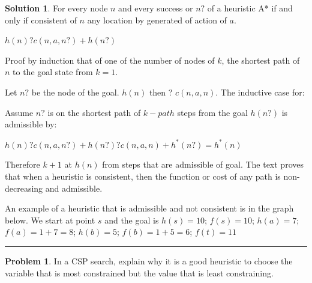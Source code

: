 \documentclass{article}
\theoremstyle{definition}
\newtheorem{problem}{Problem}
\def\fline{\rule{0.75\linewidth}{0.5pt}}
\newcommand{\finishline}{\begin{center}\fline\end{center}}
\newtheorem*{solution*}{Solution}
\newenvironment{solution}{\begin{solution*}}{{\finishline} \end{solution*}}
\begin{document}
\begin{solution}
	\item For every node $n$ and every success or $n?$ of a heuristic A* if and only if consistent of $n$ any location by generated of action of $a$. 
   	\item \begin{center}
       		 $h(n)? c(n, a, n?) + h(n?)$ 
  		 \end{center}
	\item  Proof by induction that of one of the number of nodes of $k$, the shortest path of $n$ to the goal state from $k=1$.
	\item Let $n?$ be the node of the goal. $h(n)$ then ? $c(n, a, n)$. The inductive case for:
	\item Assume $n?$ is on the shortest path of $k-path$ steps from the goal $h(n?)$ is admissible by:
	\item \begin{center}
       		 $h(n)? c(n, a, n?) + h(n?)?c(n, a, n) + h^*(n?) =  h^*(n)$
		\end{center}
	\item Therefore $k+1$ at $h(n)$ from steps that are admissible of goal. The text proves that when a heuristic is consistent, then the function or cost of any path is non-decreasing and admissible. 
	\item An example of a heuristic that is admissible and not consistent is in the graph below. We start at point $s$ and the goal is $h(s) = 10$; $f(s) = 10$; $h(a) = 7$; $f(a) = 1+7=8$; $h(b) = 5$; $f(b) = 1+5 = 6$; $f(t) = 11$
		\begin{figure}[h!]
			\centering
		 
		\end{figure}

\end{solution}

\begin{problem} %
	\item In a CSP search, explain why it is a good heuristic to choose the variable that is most constrained but the value that is least constraining. 

\end{problem}
\end{document}
